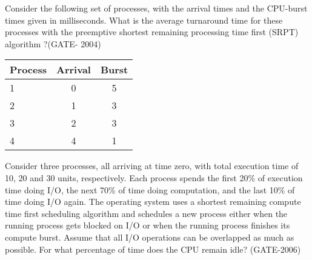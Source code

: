 

\begin{questyle}

  \question  Consider the following set of processes, with the arrival times and the CPU-burst times given in milliseconds.
            What is the average turnaround time for these processes with the preemptive shortest remaining processing
            time first (SRPT) algorithm ?(GATE- 2004)

  \begin{myTableStyle}
    \begin{center}
    \begin{tabular}{ |l|c|c| } \hline
        Process &   Arrival & Burst    \\ \hline
        1      &   0       & 5         \\ \hline
        2      &   1       & 3         \\ \hline
        3      &   2       & 3         \\ \hline
        4      &   4       & 1         \\ \hline
    \end{tabular}
    \end{center}
  \end{myTableStyle}
  \vspace{0.08in}

  \begin{oneparchoices}
  \end{oneparchoices}

  \end{questyle}




\begin{questyle}

  \question  Consider three processes, all arriving at time zero, with total execution time of 10, 20 and 30 units,
            respectively. Each process spends the first 20\% of execution time doing I/O, the next 70\% of time doing
            computation, and the last 10\% of time doing I/O again. The operating system uses a shortest remaining
            compute time first scheduling algorithm and schedules a new process either when the running process
            gets blocked on I/O or when the running process finishes its compute burst. Assume that all I/O operations
            can be overlapped as much as possible. For what percentage of time does the CPU remain idle? (GATE-2006)

  \begin{oneparchoices}
  \end{oneparchoices}

  \end{questyle}

